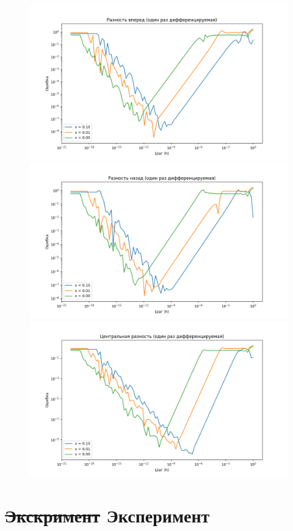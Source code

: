 \documentclass{report}
\begin{document}
\begin{figure}[H]
\centering
\includegraphics[scale=0.4]{fig_4.png}
\includegraphics[scale=0.4]{fig_5.png}
\includegraphics[scale=0.4]{fig_6.png}
\end{figure}

\section{\textbf{\sout{Экскримент} Эксперимент}}
\end{document}
